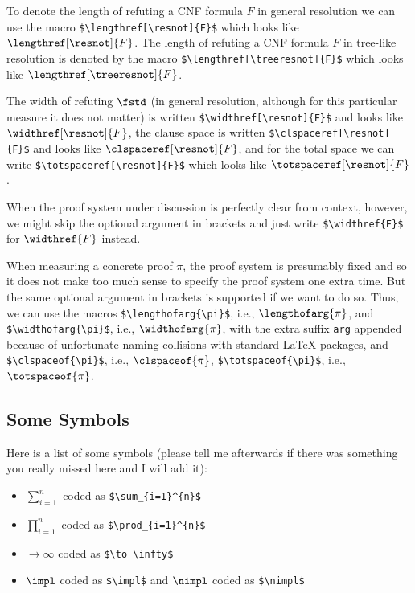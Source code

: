 To denote the length of refuting a CNF formula $F$ in general
resolution we can use the macro
\verb+$\lengthref[\resnot]{F}$+
which looks like
$\lengthref[\resnot]{F}$.
The length of refuting a CNF formula $F$ in tree-like resolution is denoted
by the macro
\verb+$\lengthref[\treeresnot]{F}$+
which looks like
$\lengthref[\treeresnot]{F}$.

The width of refuting $\fstd$ (in general resolution, although for
this particular measure it does not matter) is written
\verb+$\widthref[\resnot]{F}$+
and looks like
$\widthref[\resnot]{F}$,
the clause space is written
\verb+$\clspaceref[\resnot]{F}$+
and looks like
$\clspaceref[\resnot]{F}$,
and for the total space we can write
\verb+$\totspaceref[\resnot]{F}$+
which looks like
$\totspaceref[\resnot]{F}$.

When the proof system under discussion is perfectly clear from
context, however, we might skip the optional argument in brackets and
just write
\verb+$\widthref{F}$+
for
$\widthref{F}$
instead.


When measuring a concrete proof $\pi$, the proof system is
presumably fixed and so it does not make too much sense to specify the
proof system one extra time. But the same optional argument in
brackets is supported if we want to do so.
Thus, we can use the macros
\verb+$\lengthofarg{\pi}$+,
i.e., 
$\lengthofarg{\pi}$,
and
\verb+$\widthofarg{\pi}$+,
i.e., $\widthofarg{\pi}$,
with the extra suffix
\verb+arg+
appended
because of unfortunate naming collisions with standard \LaTeX{} packages, and
\verb+$\clspaceof{\pi}$+,
i.e., $\clspaceof{\pi}$,
\verb+$\totspaceof{\pi}$+,
i.e., $\totspaceof{\pi}$.
%    

\subsection{Some Symbols}

Here is a list of some symbols (please tell me afterwards if there was something you
really missed here and I will add it):
\begin{itemize}
\item 
  $\sum_{i=1}^{n}$ coded as \verb+$\sum_{i=1}^{n}$+
\item 
  $\prod_{i=1}^{n}$ coded as \verb+$\prod_{i=1}^{n}$+
\item 
  $\to \infty$ coded as \verb+$\to \infty$+
\item 
  $\impl$ coded as \verb+$\impl$+
  and
  $\nimpl$ coded as \verb+$\nimpl$+
\end{itemize}

